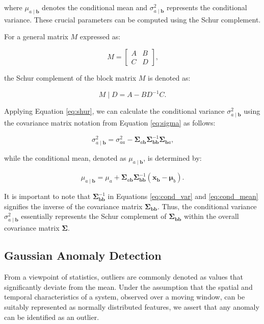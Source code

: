 where $\mu_{a \mid \boldsymbol{b}}$ denotes the conditional mean and $\sigma_{a \mid \boldsymbol{b}}^2$ represents the conditional variance. These crucial parameters can be computed using the Schur complement.

For a general matrix $M$ expressed as:

\begin{equation}
  M = \begin{bmatrix}A & B \\ C & D \end{bmatrix} \text{,}
\end{equation}

the Schur complement of the block matrix $M$ is denoted as:

\begin{equation}
  M \mid D = A - BD^{-1}C \text{.} \label{eq:shur}
\end{equation}

Applying Equation \eqref{eq:shur}, we can calculate the conditional variance $\sigma_{a \mid \boldsymbol{b}}^2$ using the covariance matrix notation from Equation \eqref{eq:sigma} as follows:

\begin{equation}
  \sigma_{a \mid \boldsymbol{b}}^2 = \sigma_{aa}^2 - \boldsymbol\Sigma_{a\boldsymbol{b}} \boldsymbol\Sigma_{\boldsymbol{bb}}^{-1} \boldsymbol\Sigma_{\boldsymbol{b}a}\text{,}\label{eq:cond_var}
\end{equation}

while the conditional mean, denoted as $\mu_{a \mid \boldsymbol{b}}$, is determined by:

\begin{equation}
  \mu_{a \mid \boldsymbol{b}} = \mu_a + \boldsymbol\Sigma_{a\boldsymbol{b}} \boldsymbol\Sigma_{\boldsymbol{bb}}^{-1} (\boldsymbol{x_b} - \boldsymbol\mu_b)\text{.}\label{eq:cond_mean}
\end{equation}

It is important to note that $\boldsymbol\Sigma_{\boldsymbol{bb}}^{-1}$ in Equations \eqref{eq:cond_var} and \eqref{eq:cond_mean} signifies the inverse of the covariance matrix $\boldsymbol\Sigma_{\boldsymbol{bb}}$. Thus, the conditional variance $\sigma_{a \mid \boldsymbol{b}}^2$ essentially represents the Schur complement of $\boldsymbol\Sigma_{\boldsymbol{bb}}$ within the overall covariance matrix $\boldsymbol\Sigma$.

\subsection{Gaussian Anomaly Detection}\label{AA:Anomaly}
From a viewpoint of statistics, outliers are commonly denoted as values that significantly deviate from the mean. Under the assumption that the spatial and temporal characteristics of a system, observed over a moving window, can be suitably represented as normally distributed features, we assert that any anomaly can be identified as an outlier.

